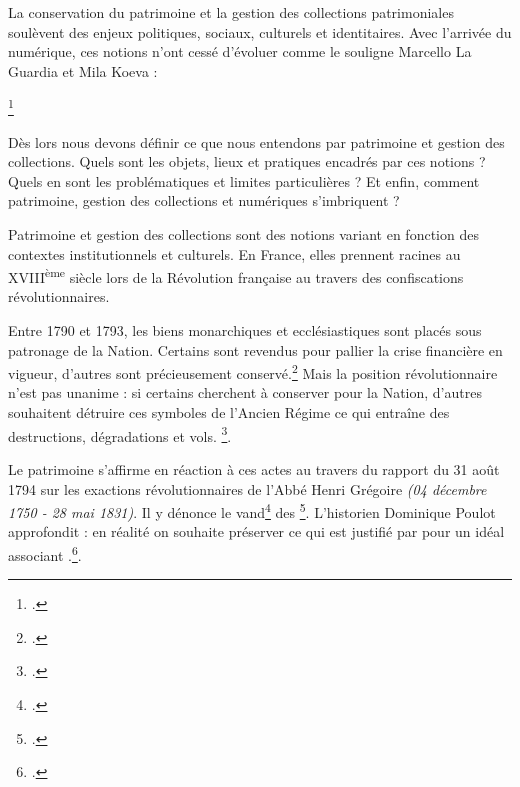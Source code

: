 

La conservation du patrimoine et la gestion des collections patrimoniales soulèvent des enjeux politiques, sociaux, culturels et identitaires. Avec l'arrivée du numérique, ces notions n'ont cessé d'évoluer comme le souligne Marcello La Guardia et Mila Koeva : 
		
\begin{displayquote}
	\footcite{laguardiaDigitalInnovationDocumentation2025}
\end{displayquote}
		
Dès lors nous devons définir ce que nous entendons par patrimoine et gestion des collections. Quels sont les objets, lieux et pratiques encadrés par ces notions ? Quels en sont les problématiques et limites particulières ? Et enfin, comment patrimoine, gestion des collections et numériques s'imbriquent ?\newline
		
Patrimoine et gestion des collections sont des notions variant en fonction des contextes institutionnels et culturels. En France, elles prennent racines au XVIII\textsuperscript{ème} siècle lors de la Révolution française au travers des confiscations révolutionnaires. 
		
Entre 1790 et 1793, les biens monarchiques et ecclésiastiques sont placés sous patronage de la Nation. Certains sont revendus pour pallier la crise financière en vigueur, d'autres sont précieusement conservé.\footcite[p.21]{varryConfiscationsRevolutionnaires2009} Mais la position révolutionnaire n'est pas unanime : si certains cherchent à conserver pour la Nation, d'autres souhaitent détruire ces symboles de l'Ancien Régime ce qui entraîne des destructions, dégradations et vols. \footcite[p.134]{mellotConfiscationsRevolutionnairesHistoire2019}.
		
Le patrimoine s'affirme en réaction à ces actes au travers du rapport du 31 août 1794 sur les exactions révolutionnaires de l'Abbé Henri Grégoire \textit{(04 décembre 1750 - 28 mai 1831)}. Il y dénonce le \gls{vand}\footcite{sprigathVandalismeRevolutionnaire179217941980a} des  \footcite{LabbeGregoire31}. L'historien Dominique Poulot approfondit : en réalité on souhaite préserver ce qui est justifié par  pour un idéal associant .\footcite[{p.183-184}]{LabbeGregoire31}.
		

